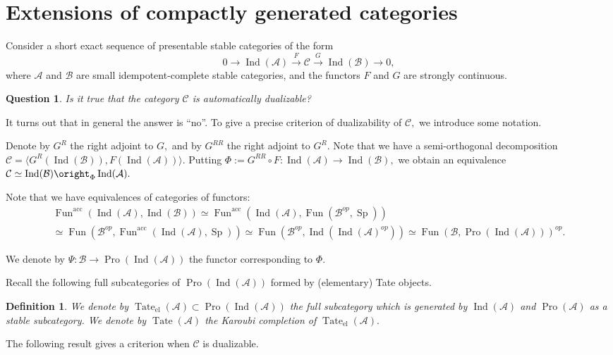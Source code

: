 \documentclass[11pt,leqno]{amsart}
\newtheorem{defi}[theo]{Definition}
\newtheorem{ques}[theo]{Question}
\numberwithin{equation}{section}
\newcommand{\xto}{\xrightarrow}
\newcommand{\Tate}{\operatorname{Tate}}
\newcommand{\el}{\operatorname{el}}
\newcommand{\acc}{\operatorname{acc}}
\newcommand{\cA}{{\mathcal A}}
\newcommand{\cB}{{\mathcal B}}
\newcommand{\cC}{{\mathcal C}}
\newcommand{\Fun}{\operatorname{Fun}}
\newcommand{\Sp}{\operatorname{Sp}}
\newcommand{\Ind}{\operatorname{Ind}}
\newcommand{\Pro}{\operatorname{Pro}}
\begin{document}
\section{Extensions of compactly generated categories}
\label{sec:extensions_of_comp_gen}

Consider a short exact sequence of presentable stable categories of the form
\begin{equation}\label{eq:extension_of_comp_gen} 0\to\Ind(\cA)\xto{F}\cC\xto{G}\Ind(\cB)\to 0,\end{equation}
where $\cA$ and $\cB$ are small idempotent-complete stable categories, and the functors $F$ and $G$ are strongly continuous.

\begin{ques}Is it true that the category $\cC$ is automatically dualizable?\end{ques}

It turns out that in general the answer is ``no''. To give a precise criterion of dualizability of $\cC,$ we introduce some notation.

Denote by $G^R$ the right adjoint to $G,$ and by $G^{RR}$ the right adjoint to $G^R.$ Note that we have a semi-orthogonal decomposition $\cC=\langle G^R(\Ind(\cB)),F(\Ind(\cA))\rangle.$ Putting $\Phi:=G^{RR}\circ F:\Ind(\cA)\to\Ind(\cB),$ we obtain an equivalence
$\cC\simeq \Ind(\cB)\oright_{\Phi}\Ind(\cA).$

Note that we have equivalences of categories of functors:
\begin{multline*}\Fun^{\acc}(\Ind(\cA),\Ind(\cB))\simeq\Fun^{\acc}(\Ind(\cA),\Fun(\cB^{op},\Sp))\\
\simeq\Fun(\cB^{op},\Fun^{\acc}(\Ind(\cA),\Sp))\simeq \Fun(\cB^{op},\Ind(\Ind(\cA)^{op}))\simeq\Fun(\cB,\Pro(\Ind(\cA)))^{op}.\end{multline*}

We denote by $\Psi:\cB\to\Pro(\Ind(\cA))$ the functor corresponding to $\Phi.$

Recall the following full subcategories of $\Pro(\Ind(\cA))$ formed by (elementary) Tate objects.

\begin{defi}\cite[Definition 1]{Hen} We denote by $\Tate_{\el}(\cA)\subset\Pro(\Ind(\cA))$ the full subcategory which is generated by $\Ind(\cA)$ and $\Pro(\cA)$ as a stable subcategory. We denote by $\Tate(\cA)$ the Karoubi completion of $\Tate_{\el}(\cA).$\end{defi}

The following result gives a criterion when $\cC$ is dualizable.
\end{document}
